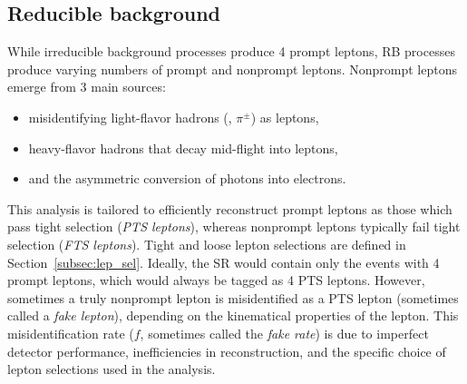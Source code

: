 \subsection{Reducible background}
\label{sec:redbkg}
While irreducible background processes produce 4 prompt leptons, RB processes produce varying numbers of prompt and nonprompt leptons.
Nonprompt leptons emerge from 3 main sources:
\begin{itemize}
    \item misidentifying light-flavor hadrons (\eg, $\pi^{\pm}$) as leptons,
    \item heavy-flavor hadrons that decay mid-flight into leptons,
    \item and the asymmetric conversion of photons into electrons.
\end{itemize}

This analysis is tailored to efficiently reconstruct prompt leptons as those which pass tight selection (\emph{PTS leptons}), whereas nonprompt leptons typically fail tight selection (\emph{FTS leptons}).
Tight and loose lepton selections are defined in Section~\ref{subsec:lep_sel}.
Ideally, the SR would contain only the events with 4 prompt leptons, which would always be tagged as 4 PTS leptons.
However, sometimes a truly nonprompt lepton is misidentified as a PTS lepton (sometimes called a \emph{fake lepton}), depending on the kinematical properties of the lepton.
This misidentification rate ($f$, sometimes called the \emph{fake rate}) is due to imperfect detector performance, inefficiencies in reconstruction, and the specific choice of lepton selections used in the analysis.


